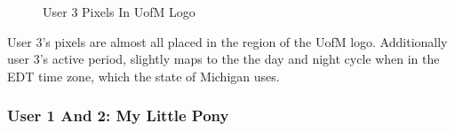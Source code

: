 \begin{figure}[H]
{\begin{minipage}{0.15\textwidth}
        \end{minipage}
    }
    \caption{User 3 Pixels In UofM Logo}
\end{figure}

User 3's pixels are almost all placed in the region of the UofM logo. Additionally user 3's active period, slightly maps to the the day and night cycle when in the EDT time zone, which the state of Michigan uses. 

\subsubsection{User 1 And 2: My Little Pony}

\begin{figure}[H]
    \centering
\end{figure}
